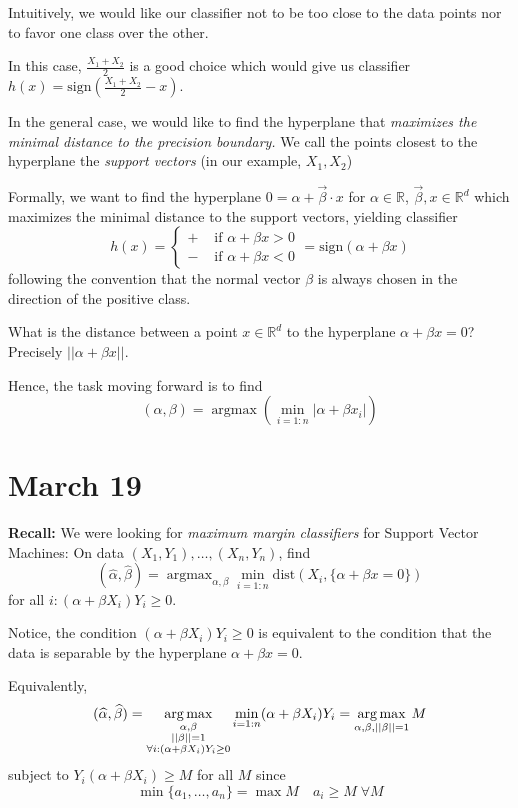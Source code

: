 \documentclass[12pt]{report}
\renewcommand{\hat}[1]{\widehat{#1}}
\newcommand{\R}{\mathbb{R}}
\newcommand{\abs}[1]{\left\vert #1 \right\vert}
\newcommand{\norm}[1]{\left\vert\left\vert #1 \right\vert\right\vert}
\newcommand*{\tbf}[1]{\ifmmode\mathbf{#1}\else\textbf{#1}\fi}
\DeclareMathOperator*{\argmax}{\arg\max}
\begin{document}
Intuitively, we would like our classifier not to be too close to the data points nor to favor one class over the other.

In this case, $\frac{X_1 + X_2}{2}$ is a good choice which would give us classifier $h(x) = \text{sign}(\frac{X_1 + X_2}{2} - x)$.

In the general case, we would like to find the hyperplane that \emph{maximizes the minimal distance to the precision boundary.} We call the points closest to the hyperplane the \emph{support vectors} (in our example, $X_1, X_2$)

Formally, we want to find the hyperplane $0 = \alpha + \vec \beta \cdot x$ for $\alpha \in \R$, $\vec \beta, x \in \R^d$ which maximizes the minimal distance to the support vectors, yielding classifier
\[h(x) = \begin{cases}
		+ & \text{ if } \alpha + \beta x > 0 \\
		- & \text{ if } \alpha + \beta x < 0
	\end{cases} = \text{sign}(\alpha + \beta x)\]
following the convention that the normal vector $\beta$ is always chosen in the direction of the positive class.

What is the distance between a point $x \in \R^d$ to the hyperplane $\alpha + \beta x = 0$? Precisely $\norm{\alpha + \beta x}$.

Hence, the task moving forward is to find
\[(\alpha, \beta) = \argmax \left(\min_{i=1:n} \abs{\alpha + \beta x_i}\right) \]

\section{March 19}
\tbf{Recall:} We were looking for \emph{maximum margin classifiers} for Support Vector Machines: On data $(X_1, Y_1), \dots, (X_n, Y_n)$, find
\[(\hat \alpha, \hat \beta) = \argmax_{\alpha, \beta} \min_{i=1:n} \text{dist}(X_i, \{\alpha + \beta x =0 \})\]
for all $i: (\alpha + \beta X_i) Y_i \geq 0$.

Notice, the condition $(\alpha + \beta X_i) Y_i \geq 0$ is equivalent to the condition that the data is separable by the hyperplane $\alpha + \beta x = 0$.

Equivalently,
\[(\hat \alpha, \hat \beta) = \argmax_{\begin{subarray}{c}
			\alpha, \beta \\
			\norm{\beta} = 1\\
			\forall i: (\alpha + \beta X_i) Y_i \geq 0
		\end{subarray}} \min_{i=1:n} (\alpha + \beta X_i) Y_i = \argmax_{\alpha, \beta, \norm{\beta}=1} M\]
subject to $Y_i(\alpha + \beta X_i) \geq M$ for all $M$ since
\[\min \{a_1, \dots, a_n\} = \max M \quad a_i \geq M\; \forall M\]
\end{document}
